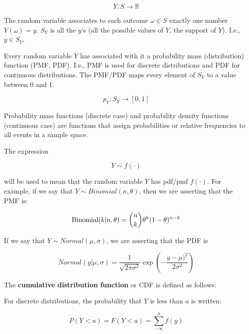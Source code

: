 \documentclass[12pt,]{krantz}
\begin{document}
\begin{equation}
Y : S \rightarrow \mathbb{R}
\end{equation}

The random variable associates to each outcome \(\omega \in S\) exactly one number \(Y(\omega) = y\). \(S_Y\) is all the \(y\)'s (all the possible values of \(Y\), the support of \(Y\)). I.e., \(y \in S_Y\).

Every random variable \(Y\) has associated with it a probability mass (distribution) function (PMF, PDF). I.e., PMF is used for discrete distributions and PDF for continuous distributions. The PMF/PDF maps every element of \(S_Y\) to a value between 0 and 1.

\begin{equation}
p_Y : S_Y \rightarrow [0, 1] 
\end{equation}

Probability mass functions (discrete case) and probability density functions (continuous case) are functions that assign probabilities or relative frequencies to all events in a sample space.

The expression

\begin{equation}
 Y \sim f(\cdot)
\end{equation}

\noindent
will be used to mean that the random variable \(Y\) has pdf/pmf \(f(\cdot)\).
For example, if we say that \(Y \sim Binomial(n,\theta)\), then we are asserting that the PMF is:

\begin{equation}
\hbox{Binomial}(k|n,\theta) = 
\binom{n}{k} \theta^{k} (1-\theta)^{n-k}
\end{equation}

If we say that \(Y\sim Normal(\mu,\sigma)\), we are asserting that the PDF is

\begin{equation}
Normal(y|\mu,\sigma)= \frac{1}{\sqrt{2\pi \sigma^2}} \exp \left(-\frac{y-\mu)^2}{2\sigma^2} \right)
\end{equation}

The \textbf{cumulative distribution function} or CDF is defined as follows:

For discrete distributions, the probability that \(Y\) is less than \(a\) is written:

\begin{equation}
P(Y<a) = F(Y<a) =\sum_{-\infty}^{a} f(y)
\end{equation}
\end{document}
